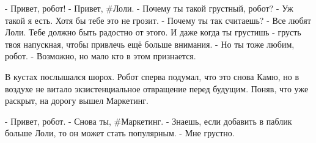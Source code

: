 - Привет, робот!
- Привет, #Лоли.
- Почему ты такой грустный, робот?
- Уж такой я есть. Хотя бы тебе это не грозит.
- Почему ты так считаешь?
- Все любят Лоли. Тебе должно быть радостно от этого. И даже когда ты грустишь - грусть твоя напускная, чтобы привлечь ещё больше внимания.
- Но ты тоже любим, робот.
- Возможно, но мало кто в этом признается.

В кустах послышался шорох. Робот сперва подумал, что это снова Камю, но в воздухе не витало экзистенциальное отвращение перед будущим.
Поняв, что уже раскрыт, на дорогу вышел Маркетинг.

- Привет, робот.
- Снова ты, #Маркетинг.
- Знаешь, если добавить в паблик больше Лоли, то он может стать популярным.
- Мне грустно.